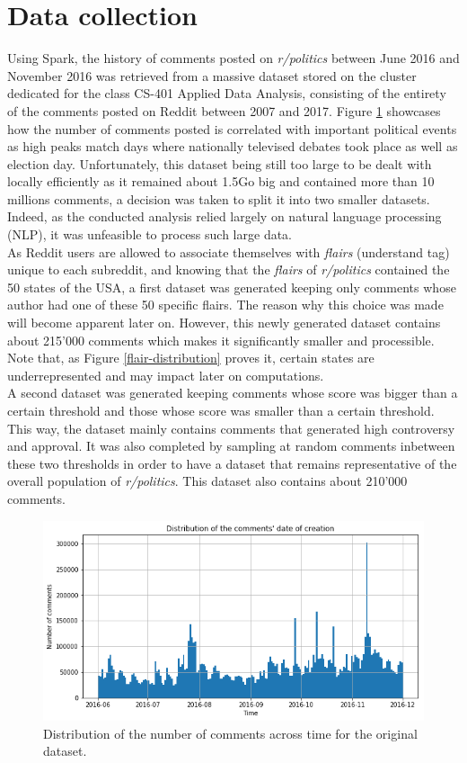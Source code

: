 \documentclass[11pt]{article}
\begin{document}
\section{Data collection}
Using Spark, the history of comments posted on \textit{r/politics} between June 2016 and November 2016 was retrieved from a massive dataset stored on the cluster dedicated for the class CS-401 Applied Data Analysis, consisting of the entirety of the comments posted on Reddit between 2007 and 2017. Figure \ref{time-distribution} showcases how the number of comments posted is correlated with important political events as high peaks match days where nationally televised debates took place as well as election day. 
Unfortunately, this dataset being still too large to be dealt with locally efficiently as it remained about 1.5Go big and contained more than 10 millions comments, a decision was taken to split it into two smaller datasets. Indeed, as the conducted analysis relied largely on natural language processing (NLP), it was unfeasible to process such large data. \\
As Reddit users are allowed to associate themselves with \textit{flairs} (understand tag) unique to each subreddit, and knowing that the \textit{flairs} of \textit{r/politics} contained the 50 states of the USA, a first dataset was generated keeping only comments whose author had one of these 50 specific flairs. The reason why this choice was made will become apparent later on. However, this newly generated dataset contains about 215'000 comments which makes it significantly smaller and processible. Note that, as Figure \ref{flair-distribution} proves it, certain states are underrepresented and may impact later on computations. \\
A second dataset was generated keeping comments whose score was bigger than a certain threshold and those whose score was smaller than a certain threshold. This way, the dataset mainly contains comments that generated high controversy and approval. It was also completed by sampling at random comments inbetween these two thresholds in order to have a dataset that remains representative of the overall population of \textit{r/politics}. This dataset also contains about 210'000 comments.

\begin{figure}
\centering
\includegraphics[scale=0.35]{Images/time-distribution.jpg}
\caption{Distribution of the number of comments across time for the original dataset.}
\label{time-distribution}
\end{figure}
\end{document}
